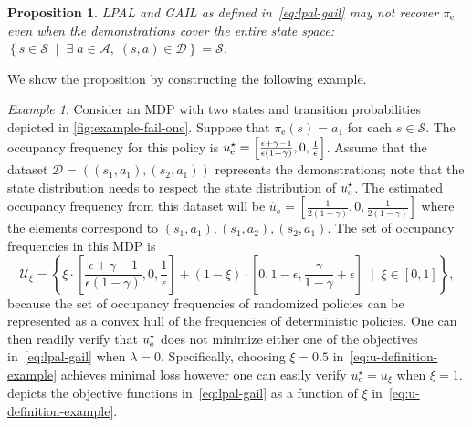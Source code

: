\documentclass[10pt]{article}
\theoremstyle{plain}
\newtheorem{proposition}{Proposition}
\theoremstyle{remark}
\newtheorem{example}{Example}
\newcommand{\gersi}[1]{\textcolor{red}{[#1]}}
\begin{document}
\begin{proposition}
LPAL and GAIL as defined in~\eqref{eq:lpal-gail} may not recover $\pi_{\mathrm{e}}$ even when the demonstrations cover the entire state space: $ \left\{ s\in \mathcal{S} \; \mid \; \exists\; a\in \mathcal{A}, \; (s,a) \in \mathcal{D} \right\} = \mathcal{S}$. 
\end{proposition}
We show the proposition by constructing the following example.
\begin{example} \label{exm:fail-all}
Consider an MDP with two states and transition probabilities depicted in \cref{fig:example-fail-one}. Suppose that $\pi_{\mathrm{e}}(s) = a_1$ for each $s\in \mathcal{S}$.  The occupancy frequency for this policy is $u^{\mathnormal{\star}}_{\mathrm{e}} = \left[ \frac{\epsilon + \gamma - 1}{\epsilon(1-\gamma)}, 0, \frac{1}{\epsilon}\right]$. Assume that the dataset $\mathcal{D} = ( (s_1, a_1), (s_2, a_1) )$ represents the demonstrations; note that the state distribution needs to respect the state distribution of $u_{\mathrm{e}}^{\mathnormal{\star}} $. The estimated occupancy frequency from this dataset will be $\hat{u}_{\mathrm{e}} = \left[\frac{1}{2(1-\gamma)}, 0, \frac{1}{2(1-\gamma)}\right]$ where the elements correspond to $(s_1, a_1), (s_1, a_2), (s_2,a_1)$. The set of occupancy frequencies in this MDP is
\begin{equation} \label{eq:u-definition-example}
  \mathcal{U}_\xi = \left\{ \xi \cdot \left[\frac{\epsilon+\gamma-1}{\epsilon(1-\gamma)}, 0, \frac{1}{\epsilon}\right] + (1-\xi) \cdot \left[0,1-\epsilon,\frac{\gamma}{1-\gamma}+\epsilon\right] \;\mid\; \xi \in [0,1]\right\},
\end{equation}
because the set of occupancy frequencies of randomized policies can be represented as a convex hull of the frequencies of deterministic policies. One can then readily verify that $u_{\mathrm{e}}^{\mathnormal{\star}} $ does not minimize either one of the objectives in~\eqref{eq:lpal-gail} when $\lambda = 0$. Specifically, choosing $\xi = 0.5$ in~\eqref{eq:u-definition-example} achieves minimal loss however one can easily verify $u^\star_{\mathrm{e}} = u_\xi$ when $\xi = 1$.  depicts the objective functions in~\eqref{eq:lpal-gail} as a function of $\xi$ in~\eqref{eq:u-definition-example}.
\end{example}
\end{document}
